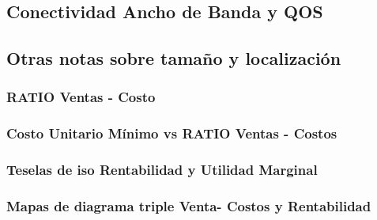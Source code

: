 \documentclass[crop=false]{standalone}
\begin{document}
\subsection{Conectividad Ancho de Banda y QOS}

\subsection{Otras notas sobre tamaño y localización}
\subsubsection{RATIO Ventas - Costo}
\subsubsection{Costo Unitario Mínimo  vs RATIO Ventas - Costos}
\subsubsection{Teselas de iso Rentabilidad y Utilidad Marginal}
\subsubsection{Mapas de diagrama triple Venta- Costos y Rentabilidad}
\end{document}

